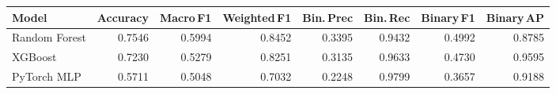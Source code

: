 \begin{tabular}{lrrrrrrr}
  \toprule
  Model & Accuracy & Macro\,F1 & Weighted\,F1 & Bin.\,Prec & Bin.\,Rec & Binary\,F1 & Binary\,AP \\
  \midrule
  Random Forest & 0.7546 & 0.5994 & 0.8452 & 0.3395 & 0.9432 & 0.4992 & 0.8785 \\
  XGBoost & 0.7230 & 0.5279 & 0.8251 & 0.3135 & 0.9633 & 0.4730 & 0.9595 \\
  PyTorch MLP & 0.5711 & 0.5048 & 0.7032 & 0.2248 & 0.9799 & 0.3657 & 0.9188 \\
  \bottomrule
\end{tabular}
